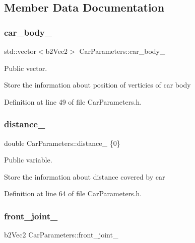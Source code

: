 \subsection{Member Data Documentation}
\mbox{\label{classCarParameters_a304345d7fd7771c87421e87785bce810}} 
\subsubsection{\texorpdfstring{car\+\_\+body\+\_\+}{car\_body\_}}
{\footnotesize\ttfamily std\+::vector$<$b2\+Vec2$>$ Car\+Parameters\+::car\+\_\+body\+\_\+}



Public vector. 

Store the information about position of verticies of car body 

Definition at line 49 of file Car\+Parameters.\+h.

\mbox{\label{classCarParameters_a79406bde604364dbb6ff6e1a19198303}} 
\subsubsection{\texorpdfstring{distance\+\_\+}{distance\_}}
{\footnotesize\ttfamily double Car\+Parameters\+::distance\+\_\+ \{0\}}



Public variable. 

Store the information about distance covered by car 

Definition at line 64 of file Car\+Parameters.\+h.

\mbox{\label{classCarParameters_a471bcf264de846ca28e52bde8780f6a8}} 
\subsubsection{\texorpdfstring{front\+\_\+joint\+\_\+}{front\_joint\_}}
{\footnotesize\ttfamily b2\+Vec2 Car\+Parameters\+::front\+\_\+joint\+\_\+}



